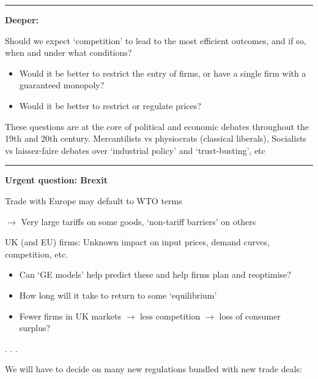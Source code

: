 \documentclass[]{article}
\providecommand{\tightlist}{%
  \setlength{\itemsep}{0pt}\setlength{\parskip}{0pt}}
\begin{document}
\begin{center}\rule{0.5\linewidth}{\linethickness}\end{center}

\textbf{Deeper:}

Should we expect `competition' to lead to the most efficient outcomes, and if so, when and under what conditions?

\begin{itemize}
\item
  Would it be better to restrict the entry of firms, or have a single firm with a guaranteed monopoly?
\item
  Would it be better to restrict or regulate prices?
\end{itemize}

These questions are at the core of political and economic debates
throughout the 19th and 20th century. Mercantilists vs physiocrats (classical liberals),
Socialists vs laissez-faire
debates over `industrial policy' and `trust-busting', etc

\begin{center}\rule{0.5\linewidth}{\linethickness}\end{center}

\textbf{Urgent question: Brexit}

\bigskip

Trade with Europe may default to WTO terms

\bigskip

\(\rightarrow\) Very large tariffs on some goods, `non-tariff barriers' on others

\bigskip

UK (and EU) firms: Unknown impact on input prices, demand curves, competition, etc.

\begin{itemize}
\item
  Can `GE models' help predict these and help firms plan and reoptimise?
\item
  How long will it take to return to some `equilibrium'
\end{itemize}

\bigskip

\begin{itemize}
\tightlist
\item
  Fewer firms in UK markets \(\rightarrow\) less competition \(\rightarrow\) loss of consumer surplus?
\end{itemize}

. . .

We will have to decide on many new regulations bundled with new trade deals:
\end{document}
